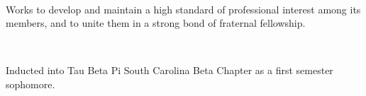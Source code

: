 \documentclass[letterpaper]{deedy-resume}
\begin{document}
\begin{minipage}[t]{0.69\textwidth}
 \\
\begin{tightitemize}
\item Works to develop and maintain a high standard of professional interest among its members, and to unite them in a strong bond of fraternal fellowship. 
\end{tightitemize}
\sectionspace 

  \\
\begin{tightitemize}
\item Inducted into Tau Beta Pi South Carolina Beta Chapter as a first semester sophomore.
\end{tightitemize}
\sectionspace 

\end{minipage}
\end{document}
